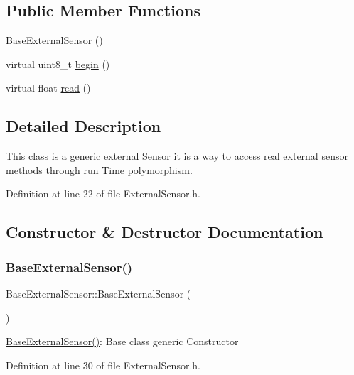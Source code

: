 \subsection*{Public Member Functions}
\begin{DoxyCompactItemize}
\item 
\hyperlink{classBaseExternalSensor_a978d96a6563b646efb358c2790a9fc6f}{Base\+External\+Sensor} ()
\item 
virtual uint8\+\_\+t \hyperlink{classBaseExternalSensor_a87d132803d4f4fdd4e66332809f0c9a0}{begin} ()
\item 
virtual float \hyperlink{classBaseExternalSensor_a1564f16deacf57b51b9948ac29db4291}{read} ()
\end{DoxyCompactItemize}


\subsection{Detailed Description}
This class is a generic external Sensor it is a way to access real external sensor methods through run Time polymorphism. 

Definition at line 22 of file External\+Sensor.\+h.



\subsection{Constructor \& Destructor Documentation}
\mbox{\label{classBaseExternalSensor_a978d96a6563b646efb358c2790a9fc6f}} 
\subsubsection{\texorpdfstring{Base\+External\+Sensor()}{BaseExternalSensor()}}
{\footnotesize\ttfamily Base\+External\+Sensor\+::\+Base\+External\+Sensor (\begin{DoxyParamCaption}{ }\end{DoxyParamCaption})\hspace{0.3cm}{\ttfamily [inline]}}

\hyperlink{classBaseExternalSensor_a978d96a6563b646efb358c2790a9fc6f}{Base\+External\+Sensor()}\+: Base class generic Constructor 

Definition at line 30 of file External\+Sensor.\+h.


